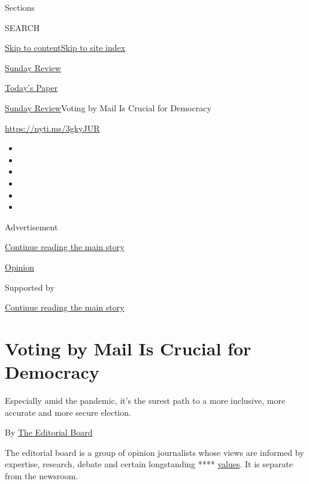 Sections

SEARCH

\protect\hyperlink{site-content}{Skip to
content}\protect\hyperlink{site-index}{Skip to site index}

\href{https://www.nytimes3xbfgragh.onion/section/opinion/sunday}{Sunday
Review}

\href{https://myaccount.nytimes3xbfgragh.onion/auth/login?response_type=cookie\&client_id=vi}{}

\href{https://www.nytimes3xbfgragh.onion/section/todayspaper}{Today's
Paper}

\href{/section/opinion/sunday}{Sunday Review}\textbar{}Voting by Mail Is
Crucial for Democracy

\href{https://nyti.ms/3gkyJUR}{https://nyti.ms/3gkyJUR}

\begin{itemize}
\item
\item
\item
\item
\item
\item
\end{itemize}

Advertisement

\protect\hyperlink{after-top}{Continue reading the main story}

\href{/section/opinion}{Opinion}

Supported by

\protect\hyperlink{after-sponsor}{Continue reading the main story}

\hypertarget{voting-by-mail-is-crucial-for-democracy}{%
\section{Voting by Mail Is Crucial for
Democracy}\label{voting-by-mail-is-crucial-for-democracy}}

Especially amid the pandemic, it's the surest path to a more inclusive,
more accurate and more secure election.

By
\href{https://www.nytimes3xbfgragh.onion/interactive/opinion/editorialboard.html}{The
Editorial Board}

The editorial board is a group of opinion journalists whose views are
informed by expertise, research, debate and certain longstanding ****
\href{https://www.nytimes3xbfgragh.onion/interactive/2018/opinion/editorialboard.html}{values}.
It is separate from the newsroom.

